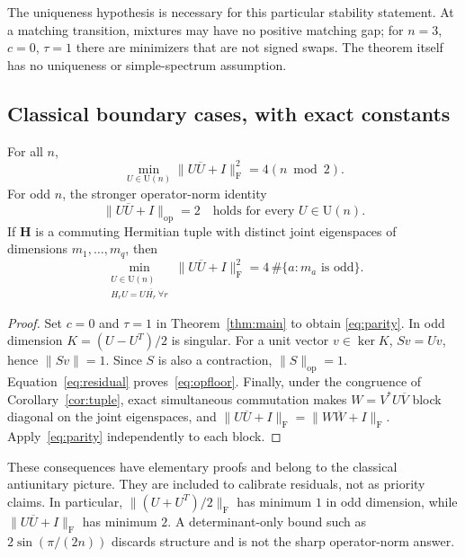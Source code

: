 \documentclass[11pt]{article}
\newcommand{\U}{\mathrm U}
\newcommand{\F}{\mathrm F}
\newcommand{\op}{\mathrm{op}}
\begin{document}
The uniqueness hypothesis is necessary for this particular stability
statement. At a matching transition, mixtures may have no positive
matching gap; for $n=3$, $c=0$, $\tau=1$ there are minimizers that are
not signed swaps. The theorem itself has no uniqueness or
simple-spectrum assumption.

\subsection{Classical boundary cases, with exact constants}

\begin{corollary}\label{cor:parity}
For all $n$,
\begin{equation}\label{eq:parity}
 \min_{U\in\U(n)}\|U\overline U+I\|_\F^2
 =4(n\bmod2).
\end{equation}
For odd $n$, the stronger operator-norm identity
\begin{equation}\label{eq:opfloor}
 \|U\overline U+I\|_\op=2
 \quad\text{holds for every }U\in\U(n).
\end{equation}
If $\mathbf H$ is a commuting Hermitian tuple with distinct joint
eigenspaces of dimensions $m_1,\ldots,m_q$, then
\begin{equation}\label{eq:commuting}
 \min_{\substack{U\in\U(n)\\H_rU=U\overline{H_r}\ \forall r}}
   \|U\overline U+I\|_\F^2
 =4\,\#\{a:m_a\text{ is odd}\}.
\end{equation}
\end{corollary}
\begin{proof}
Set $c=0$ and $\tau=1$ in Theorem~\ref{thm:main} to obtain
\eqref{eq:parity}. In odd dimension $K=(U-U^T)/2$ is singular.
For a unit vector $v\in\ker K$, $Sv=Uv$, hence $\|Sv\|=1$.
Since $S$ is also a contraction, $\|S\|_\op=1$. Equation~\eqref{eq:residual}
proves~\eqref{eq:opfloor}. Finally, under the congruence of
Corollary~\ref{cor:tuple}, exact simultaneous commutation makes
$W=V^*U\overline V$ block diagonal on the joint eigenspaces, and
$\|U\overline U+I\|_\F=\|W\overline W+I\|_\F$. Apply~\eqref{eq:parity}
independently to each block.
\end{proof}

These consequences have elementary proofs and belong to the classical
antiunitary picture. They are included to calibrate residuals, not as
priority claims. In particular, $\|(U+U^T)/2\|_\F$ has minimum $1$
in odd dimension, while $\|U\overline U+I\|_\F$ has minimum $2$.
A determinant-only bound such as $2\sin(\pi/(2n))$ discards structure
and is not the sharp operator-norm answer.
\end{document}
